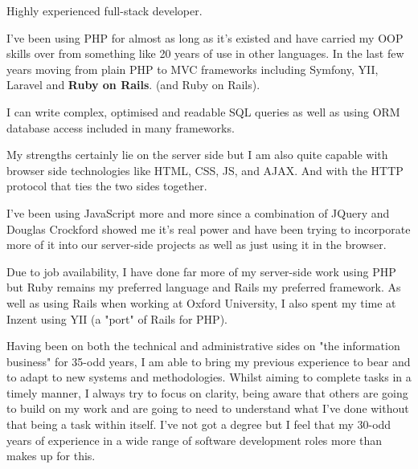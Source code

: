 \topHeading{}



Highly experienced full-stack developer.

I've been using PHP for almost as long as it's existed
and have carried my OOP skills over from something like 20 years
of use in other languages.
In the last few years moving from plain PHP to MVC frameworks
including Symfony, YII, Laravel
\ifnum{}
and \textbf{Ruby on Rails}.
\else
(and Ruby on Rails).
\fi

I can write complex, optimised and readable SQL queries
as well as using ORM database access included in many frameworks.

\ifnum{}
    My strengths certainly lie on the server side
    but I am also quite capable with browser side
    technologies like HTML, CSS, JS, and AJAX.
    And with the HTTP protocol that ties the two sides together.
\fi

\ifnum{}
    I've been using JavaScript more and more since a combination
    of JQuery and Douglas Crockford showed me it's real power
    and have been trying to incorporate more of it into our
    server-side projects as well as just using it in the browser.
\fi

\ifnum{}
    Due to job availability, I have done far more of my server-side work
    using PHP but Ruby remains my preferred language
    and Rails my preferred framework.
    As well as using Rails when working at Oxford University,
    I also spent my time at Inzent using YII (a "port" of Rails for PHP).
\fi

\ifnum{}
    Having been on both the technical and administrative sides on
    "the information business" for 35-odd years,
    I am able to bring my previous experience to bear and to adapt
    to new systems and methodologies.
    Whilst aiming to complete tasks in a timely manner,
    I always try to focus on clarity,
    being aware that others are going to build on my work
    and are going to need to understand what I've done
    without that being a task within itself.
\else
    I've not got a degree but I feel that my 30-odd years of
    experience in a wide range of software development roles
    more than makes up for this.
\fi

